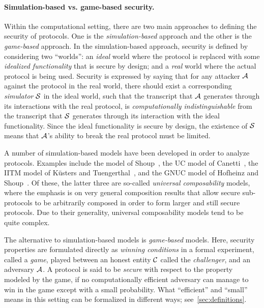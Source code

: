 \paragraph{Simulation-based vs. game-based security.}
Within the computational setting,
there are two main approaches to defining the security of protocols. 
One is the \emph{simulation-based} approach
and the other is the \emph{game-based} approach.
In the simulation-based approach,
security is defined by considering two ``worlds'': 
an \emph{ideal} world where the protocol is replaced with some \emph{idealized functionality}  that is secure by design;
and a \emph{real} world where the actual protocol is being used.
Security is expressed by saying that for any attacker $\A$ against the protocol in the real world,
there should exist a corresponding \emph{simulator} $\A[S]$ in the ideal world,
such that the transcript that $\A$ generates through its interactions with the real protocol,
is \emph{computationally indistinguishable} from the transcript that $\A[S]$ generates through its interaction with the ideal functionality.
Since the ideal functionality is secure by design,
the existence of $\A[S]$ means that $\A$'s ability to break the real protocol must be limited.

A number of simulation-based models have been developed in order to analyze protocols.
Examples include the model of Shoup~\cite{EPRINT:Shoup99b},
the UC model of Canetti~\cite{FOCS:Canetti01},
the IITM model of Küsters and Tuengerthal~\cite{EPRINT:KueTue13},
and the GNUC model of Hofheinz and Shoup~\cite{JC:HofSho15}.
Of these,
the latter three are so-called \emph{universal composability} models,
where the emphasis is on very general composition results that allow secure sub-protocols to be arbitrarily composed in order to form larger and still secure protocols.
Due to their generality,
universal composability models tend to be quite complex.  

The alternative to simulation-based models is \emph{game-based} models.
Here,
security properties are formulated directly as \emph{winning conditions} in a formal experiment,
called a \emph{game},
played between an honest entity $\A[C]$ called the \emph{challenger},
and an adversary $\A$.
A protocol is said to be \emph{secure} with respect to the property modeled by the game,
if no computationally efficient adversary can manage to win in the game except with a small probability.
What ``efficient'' and ``small'' means in this setting can be formalized in different ways;
see~\cref{sec:definitions}.

